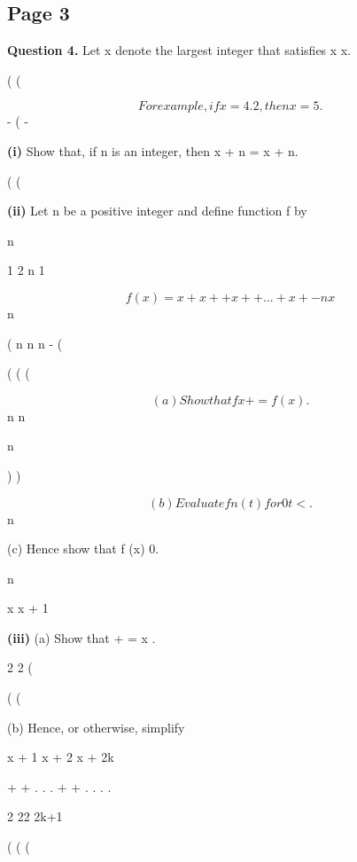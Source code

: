 \documentclass[12pt]{article}
\begin{document}
\subsection*{Page 3}
\begin{flushleft}
\bigskip\textbf{Question 4.} Let x denote the largest integer that satisfies x  x.\par
(  (\par
\[For example, if x = 4.2, then x = 5.\]
-  ( -\par
\textbf{(i)} Show that, if n is an integer, then x + n = x + n.\par
(  (\par
\textbf{(ii)} Let n be a positive integer and define function f by\par
n\par
1 2 n 1\par
\[f (x) = x + x + + x + + . . . + x + - nx\]
n\par
( n n n -  (\par
(  (  (\par
\[(a) Show that f x + = f (x).\]
n n\par
n\par
) )\par
\[(b) Evaluate f n (t) for 0  t < .\]
n\par
(c) Hence show that f (x) 0.\par
n\par
\equiv\par
x x + 1\par
\textbf{(iii)} (a) Show that + = x .\par
2 2  (\par
(  (\par
(b) Hence, or otherwise, simplify\par
x + 1 x + 2 x + 2k\par
+ + . . . + + . . . .\par
2 22 2k+1\par
(  (  (\par
\end{flushleft}
\end{document}
